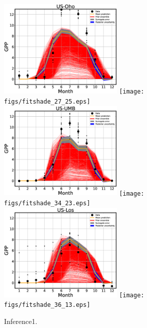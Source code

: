 \documentclass[12pt]{article}
\begin{document}
\begin{figure}[!hb]
\includegraphics[width=0.53\textwidth]{figs/fit1d_27_25.eps}\hfill
\texttt{[image: figs/fitshade\_27\_25.eps]}\\
\includegraphics[width=0.53\textwidth]{figs/fit1d_34_23.eps}\hfill
\texttt{[image: figs/fitshade\_34\_23.eps]}\\
\includegraphics[width=0.53\textwidth]{figs/fit1d_36_13.eps}\hfill
\texttt{[image: figs/fitshade\_36\_13.eps]}
\caption{\label{fig:fits1} Inference1.}
\end{figure}
\end{document}
